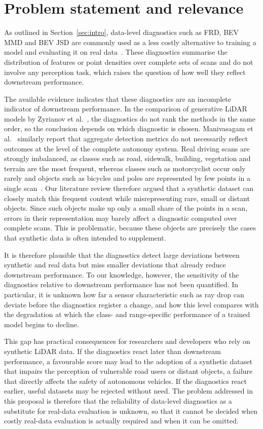 \section{Problem statement and relevance}\label{sec:problem}
As outlined in Section~\ref{sec:intro}, data-level diagnostics such as FRD, BEV MMD and BEV JSD are commonly used as a less costly alternative to training a model and evaluating it on real data~\cite{zyrianovLearningGenerateRealistic2022}. These diagnostics summarise the distribution of features or point densities over complete sets of scans and do not involve any perception task, which raises the question of how well they reflect downstream performance.

The available evidence indicates that these diagnostics are an incomplete indicator of downstream performance. In the comparison of generative LiDAR models by Zyrianov et al.~\cite{zyrianovLearningGenerateRealistic2022}, the diagnostics do not rank the methods in the same order, so the conclusion depends on which diagnostic is chosen. Manivasagam et al.~\cite{manivasagamZeroDomainGap2023} similarly report that aggregate detection metrics do not necessarily reflect outcomes at the level of the complete autonomy system. Real driving scans are strongly imbalanced, as classes such as road, sidewalk, building, vegetation and terrain are the most frequent, whereas classes such as motorcyclist occur only rarely and objects such as bicycles and poles are represented by few points in a single scan~\cite{behleySemanticKITTIDatasetSemantic2019a}. Our literature review therefore argued that a synthetic dataset can closely match this frequent content while misrepresenting rare, small or distant objects. Since such objects make up only a small share of the points in a scan, errors in their representation may barely affect a diagnostic computed over complete scans. This is problematic, because these objects are precisely the cases that synthetic data is often intended to supplement.

It is therefore plausible that the diagnostics detect large deviations between synthetic and real data but miss smaller deviations that already reduce downstream performance. To our knowledge, however, the sensitivity of the diagnostics relative to downstream performance has not been quantified. In particular, it is unknown how far a sensor characteristic such as ray drop can deviate before the diagnostics register a change, and how this level compares with the degradation at which the class- and range-specific performance of a trained model begins to decline.

This gap has practical consequences for researchers and developers who rely on synthetic LiDAR data. If the diagnostics react later than downstream performance, a favourable score may lead to the adoption of a synthetic dataset that impairs the perception of vulnerable road users or distant objects, a failure that directly affects the safety of autonomous vehicles. If the diagnostics react earlier, useful datasets may be rejected without need. The problem addressed in this proposal is therefore that the reliability of data-level diagnostics as a substitute for real-data evaluation is unknown, so that it cannot be decided when costly real-data evaluation is actually required and when it can be omitted.